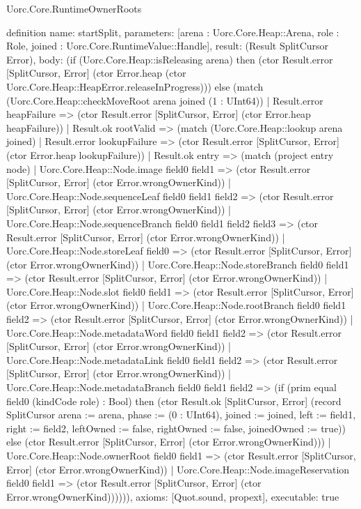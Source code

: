 \begin{lexlean}{Uorc.Core.RuntimeOwnerRoots}
\begin{semanticmodule}
definition{
  name: startSplit,
  parameters: [arena : Uorc.Core.Heap::Arena, role : Role, joined : Uorc.Core.RuntimeValue::Handle],
  result: (Result SplitCursor Error),
  body: (if (Uorc.Core.Heap::isReleasing arena) then (ctor Result.error [SplitCursor, Error] (ctor Error.heap (ctor Uorc.Core.Heap::HeapError.releaseInProgress))) else (match (Uorc.Core.Heap::checkMoveRoot arena joined (1 : UInt64))
    | Result.error heapFailure => (ctor Result.error [SplitCursor, Error] (ctor Error.heap heapFailure))
    | Result.ok rootValid => (match (Uorc.Core.Heap::lookup arena joined)
      | Result.error lookupFailure => (ctor Result.error [SplitCursor, Error] (ctor Error.heap lookupFailure))
      | Result.ok entry => (match (project entry node)
        | Uorc.Core.Heap::Node.image field0 field1 => (ctor Result.error [SplitCursor, Error] (ctor Error.wrongOwnerKind))
        | Uorc.Core.Heap::Node.sequenceLeaf field0 field1 field2 => (ctor Result.error [SplitCursor, Error] (ctor Error.wrongOwnerKind))
        | Uorc.Core.Heap::Node.sequenceBranch field0 field1 field2 field3 => (ctor Result.error [SplitCursor, Error] (ctor Error.wrongOwnerKind))
        | Uorc.Core.Heap::Node.storeLeaf field0 => (ctor Result.error [SplitCursor, Error] (ctor Error.wrongOwnerKind))
        | Uorc.Core.Heap::Node.storeBranch field0 field1 => (ctor Result.error [SplitCursor, Error] (ctor Error.wrongOwnerKind))
        | Uorc.Core.Heap::Node.slot field0 field1 => (ctor Result.error [SplitCursor, Error] (ctor Error.wrongOwnerKind))
        | Uorc.Core.Heap::Node.rootBranch field0 field1 field2 => (ctor Result.error [SplitCursor, Error] (ctor Error.wrongOwnerKind))
        | Uorc.Core.Heap::Node.metadataWord field0 field1 field2 => (ctor Result.error [SplitCursor, Error] (ctor Error.wrongOwnerKind))
        | Uorc.Core.Heap::Node.metadataLink field0 field1 field2 => (ctor Result.error [SplitCursor, Error] (ctor Error.wrongOwnerKind))
        | Uorc.Core.Heap::Node.metadataBranch field0 field1 field2 => (if (prim equal field0 (kindCode role) : Bool) then (ctor Result.ok [SplitCursor, Error] (record SplitCursor {arena := arena, phase := (0 : UInt64), joined := joined, left := field1, right := field2, leftOwned := false, rightOwned := false, joinedOwned := true})) else (ctor Result.error [SplitCursor, Error] (ctor Error.wrongOwnerKind)))
        | Uorc.Core.Heap::Node.ownerRoot field0 field1 => (ctor Result.error [SplitCursor, Error] (ctor Error.wrongOwnerKind))
        | Uorc.Core.Heap::Node.imageReservation field0 field1 => (ctor Result.error [SplitCursor, Error] (ctor Error.wrongOwnerKind)))))),
  axioms: [Quot.sound, propext],
  executable: true
}


\end{semanticmodule}
\end{lexlean}
